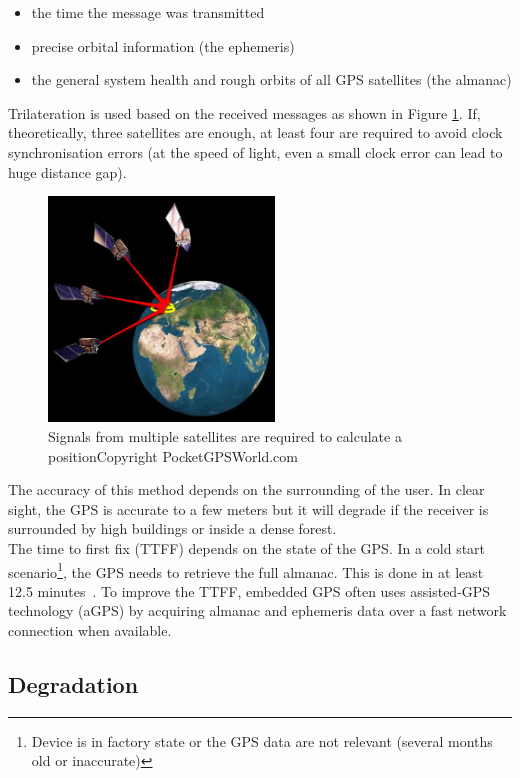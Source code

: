 \begin{itemize}
\item the time the message was transmitted
\item precise orbital information (the ephemeris)
\item the general system health and rough orbits of all GPS satellites (the almanac)
\end{itemize}

Trilateration is used based on the received messages as shown in Figure \ref{fig:gps-earth}.
If, theoretically, three satellites are enough, at least four are required to avoid clock synchronisation errors (at the speed of light, even a small clock error can lead to huge distance gap).\\

\begin{figure}[h]
  \centering
  \includegraphics[width=6cm]{images/gps.jpg}
  \caption{Signals from multiple satellites are required to calculate a position\newline Copyright PocketGPSWorld.com}
  \label{fig:gps-earth}
\end{figure}


The accuracy of this method depends on the surrounding of the user.
In clear sight, the GPS is accurate to a few meters but it will degrade if the receiver is surrounded by high buildings or inside a dense forest.\\

The time to first fix (TTFF) depends on the state of the GPS.
In a cold start scenario\footnote{Device is in factory state or the GPS data are not relevant (several months old or inaccurate)}, the GPS needs to retrieve the full almanac.
This is done in at least 12.5 minutes~\cite{gpsuser}.
To improve the TTFF, embedded GPS often uses assisted-GPS technology (aGPS) by acquiring almanac and ephemeris data over a fast network connection when available.

\subsection{Degradation}


